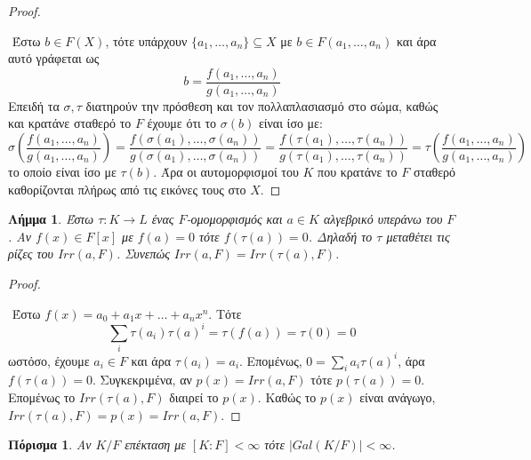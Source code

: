 \documentclass[oneside,a4paper]{article}
\newtheorem{lemma}{Λήμμα}
\newtheorem{cor}{Πόρισμα}
\begin{document}
\begin{proof} $ $
	
	$ $\newline
	Έστω $b \in F(X)$, τότε υπάρχουν $\{a_1, \ldots, a_n\} \subseteq X$ με $b \in F(a_1 , \ldots , a_n)$ και άρα αυτό γράφεται ως
	$$ b= \frac{f(a_1,\ldots, a_n)}{g(a_1, \ldots , a_n)}$$
	Επειδή τα $\sigma , \tau$ διατηρούν την πρόσθεση και τον πολλαπλασιασμό στο σώμα, καθώς και κρατάνε σταθερό το $F$ έχουμε ότι το $\sigma (b)$ είναι ίσο με:
	$$\sigma \left( \frac{f(a_1,\ldots, a_n)}{g(a_1, \ldots , a_n)} \right) =\frac{f(\sigma(a_1),\ldots, \sigma(a_n))}{g(\sigma(a_1), \ldots , \sigma (a_n))} = \frac{f(\tau(a_1),\ldots, \tau(a_n))}{g(\tau(a_1), \ldots , \tau(a_n))} = \tau \left( \frac{f(a_1,\ldots, a_n)}{g(a_1, \ldots , a_n)} \right)$$
	το οποίο είναι ίσο με $\tau (b)$. Άρα οι αυτομορφισμοί του $K$ που κρατάνε το $F$ σταθερό καθορίζονται πλήρως από τις εικόνες τους στο $X$.
\end{proof}


\vspace{0.1cm}
\begin{lemma}
	Έστω $\tau : K \rightarrow L$ ένας $F$-ομομορφισμός και $a \in K$ αλγεβρικό υπεράνω του $F$. Αν $f(x) \in F[x]$ με $f(a)=0$ τότε $f(\tau(a)) = 0$. Δηλαδή το $\tau$ μεταθέτει τις ρίζες του $Irr(a,F)$. Συνεπώς $Irr(a,F) = Irr(\tau(a),F)$.
\end{lemma}

\begin{proof} $ $

	$ $\newline
	Έστω $f(x) = a_0 + a_1 x + \ldots + a_n x^n$. Τότε 
	$$\sum\limits_{i} \tau( a_i) \tau(a)^i = \tau ( f(a)) = \tau ( 0) = 0$$
	ωστόσο, έχουμε $a_i \in F$ και άρα $\tau (a_i) = a_i$. Επομένως, $0 = \sum\limits_i a_i \tau(a)^i$, άρα $f(\tau(a))= 0$. Συγκεκριμένα, αν $p(x) = Irr(a,F)$ τότε $p(\tau(a)) = 0$. Επομένως το $Irr(\tau(a),F)$ διαιρεί το $p(x)$. Καθώς το $p(x)$ είναι ανάγωγο, $Irr(\tau(a),F) = p(x) = Irr(a,F)$.

\end{proof}
\vspace{0.1cm}
\begin{cor}
	Αν $K/F$ επέκταση με $[K:F]<\infty$ τότε $|Gal(K/F)| <\infty$.
\end{cor}
\end{document}
